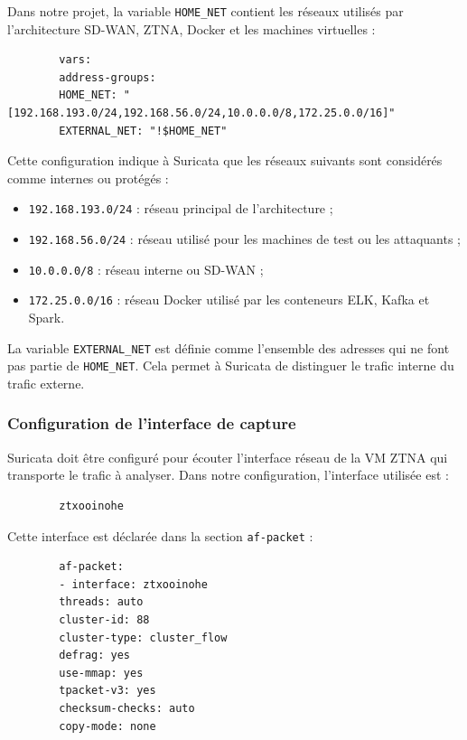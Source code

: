 \documentclass[12pt,a4paper,oneside]{report}
\begin{document}
	Dans notre projet, la variable \texttt{HOME\_NET} contient les réseaux utilisés par l'architecture SD-WAN, ZTNA, Docker et les machines virtuelles :
	
	\begin{lstlisting}
		vars:
		address-groups:
		HOME_NET: "[192.168.193.0/24,192.168.56.0/24,10.0.0.0/8,172.25.0.0/16]"
		EXTERNAL_NET: "!$HOME_NET"
	\end{lstlisting}
	
	Cette configuration indique à Suricata que les réseaux suivants sont considérés comme internes ou protégés :
	
	\begin{itemize}
		\item \texttt{192.168.193.0/24} : réseau principal de l'architecture ;
		\item \texttt{192.168.56.0/24} : réseau utilisé pour les machines de test ou les attaquants ;
		\item \texttt{10.0.0.0/8} : réseau interne ou SD-WAN ;
		\item \texttt{172.25.0.0/16} : réseau Docker utilisé par les conteneurs ELK, Kafka et Spark.
	\end{itemize}
	
	La variable \texttt{EXTERNAL\_NET} est définie comme l'ensemble des adresses qui ne font pas partie de \texttt{HOME\_NET}. Cela permet à Suricata de distinguer le trafic interne du trafic externe.
	
	\subsubsection{Configuration de l'interface de capture}
	
	Suricata doit être configuré pour écouter l'interface réseau de la VM ZTNA qui transporte le trafic à analyser. Dans notre configuration, l'interface utilisée est :
	
	\begin{lstlisting}
		ztxooinohe
	\end{lstlisting}
	
	Cette interface est déclarée dans la section \texttt{af-packet} :
	
	\begin{lstlisting}
		af-packet:
		- interface: ztxooinohe
		threads: auto
		cluster-id: 88
		cluster-type: cluster_flow
		defrag: yes
		use-mmap: yes
		tpacket-v3: yes
		checksum-checks: auto
		copy-mode: none
	\end{lstlisting}
	
\end{document}
